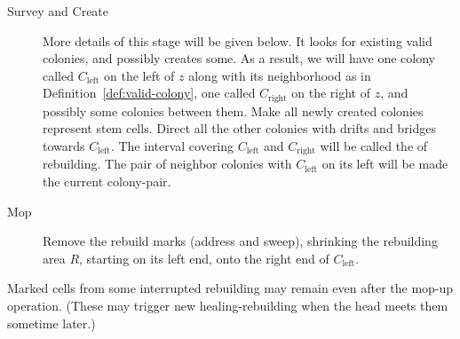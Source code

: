 \documentclass[11pt]{memoir}
\theoremstyle{definition} %
\def\B{B}
\newcommand{\Int}{\mathrm{Int}} %
\newcommand{\Q}{Q} %
\newcommand{\Left}{\text{left}}
\newcommand{\Right}{\text{right}}
\newcommand{\cns}[1]{c_{\textrm{\upshape #1}}}
\newcommand{\CRebuild}{\cns{Rebuild}}
\newcommand{\CSpill}{\cns{spill}}
\begin{document}
\begin{description}
 \item[Survey and Create]
More details of this stage will be given below.
It looks for existing valid colonies, and possibly creates some.
As a result, we will have one colony called \( C_{\Left} \)
on the left of \( z \) along with its neighborhood as in Definition~\ref{def:valid-colony},
one called \( C_{\Right} \) on the right of \( z \), and possibly some colonies between them.
Make all newly created colonies represent stem cells.
Direct all the other colonies with drifts and bridges towards \( C_{\Left} \).
The interval covering \( C_{\Left} \) and \( C_{\Right} \)
will be called the  of rebuilding.
The pair of neighbor colonies with \( C_{\Left} \) on its left will be made the current colony-pair.

\item[Mop] Remove the rebuild marks (address and sweep),
  shrinking the rebuilding area \( R \), starting on its left end,
  onto the right end of \( C_{\Left} \).



  
\end{description}

Marked cells from some interrupted rebuilding may remain even after the mop-up operation.
(These may trigger new healing-rebuilding when the head meets them sometime later.)

\end{document}
